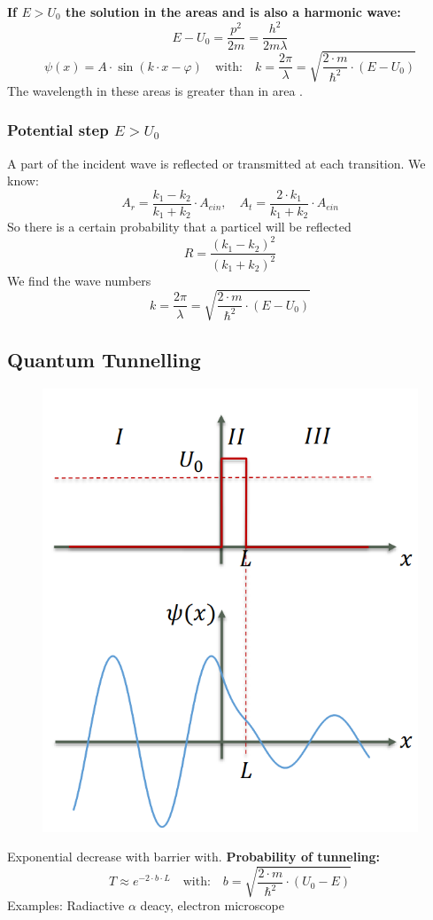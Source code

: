 \textbf{If \(E > U_0\) the solution in the areas  and  is also a harmonic wave:}
\[
E - U_0 = \frac{p^2}{2m} = \frac{h^2}{2m\lambda}
\]
\begin{equation*}
    \psi(x) = A\cdot \sin(k\cdot x-\varphi)\quad\text{with:}\quad k= \frac{2\pi}{\lambda} = \sqrt{\frac{2\cdot m}{\hbar^2}\cdot(E-U_0)}
\end{equation*}
The wavelength in these areas is greater than in area .
\subsubsection{Potential step \(E > U_0\)}
A part of the incident wave is reflected or transmitted at each transition. We know:
\begin{equation*}
    A_r = \frac{k_1 - k_2}{k_1 + k_2}\cdot A_{ein}, \quad A_t = \frac{2\cdot k_1}{k_1 + k_2} \cdot A_{ein}
\end{equation*}
So there is a certain probability that a particel will be reflected
\begin{equation*}
    R = \frac{(k_1 - k_2)^2}{(k_1 + k_2)^2}
\end{equation*}
We find the wave numbers
\begin{equation*}
    k = \frac{2\pi}{\lambda} = \sqrt{\frac{2 \cdot m}{\hbar^2}\cdot (E-U_0)}
\end{equation*}
\subsection{Quantum Tunnelling}
\begin{figure}[h]
    \centering
    \includegraphics[width=0.4\columnwidth]{images/tunnel.png}
    \label{fig:tunnel}
\end{figure}
Exponential decrease with barrier with. \textbf{Probability of tunneling:}
\begin{equation*}
    T \approx e^{-2\cdot b\cdot L} \quad\text{with:}\quad b = \sqrt{\frac{2\cdot m}{\hbar^2}\cdot (U_0 - E)}
\end{equation*}
Examples: Radiactive \(\alpha\) deacy, electron microscope
